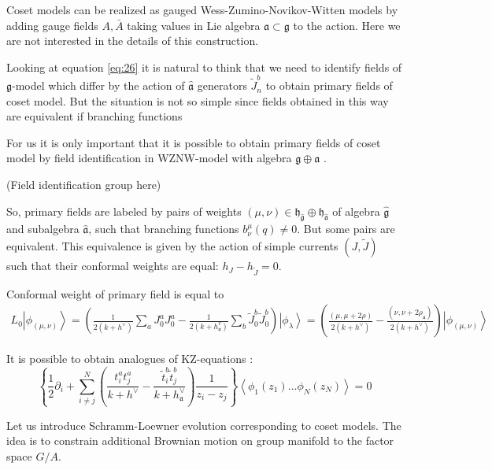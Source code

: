 \documentclass[a4paper]{jpconf}
\theoremstyle{definition}
\newcommand{\gf}{\mathfrak{g}}
\newcommand{\af}{\mathfrak{a}}
\newcommand{\hf}{\mathfrak{h}}
\newcommand{\gfh}{\hat{\mathfrak{g}}}
\newcommand{\afh}{\hat{\mathfrak{a}}}
\theoremstyle{definition} \newtheorem{Def}{Definition}
\begin{document}
Coset models can be realized as gauged Wess-Zumino-Novikov-Witten models by adding gauge fields  $A, \bar{A}$ taking values in Lie algebra $\af\subset \gf$ to the action\cite{gawdzki1988g}. Here we are not interested in the details of this construction. 

Looking at equation \eqref{eq:26} it is natural to think that we need to identify fields of $\gf$-model which differ by the action of $\afh$ generators $\tilde{J}_{n}^{b}$ to obtain primary fields of coset model. But the situation is not so simple since fields obtained in this way are equivalent if branching functions 

For us it is only important that it is possible to obtain primary fields of coset model by field identification in WZNW-model with algebra $\gf\oplus \af$ \cite{fuchs1996resolution,schellekens1990field}.

(Field identification group here)
 
So, primary fields are labeled by pairs of weights $(\mu,\nu)\in \hf_{\gfh}\oplus \hf_{\afh}$  of algebra $\gfh$ and subalgebra $\afh$, such that branching functions $b^{\mu}_{\nu}(q)\neq 0$. But some pairs are equivalent. This equivalence is given by the action of simple currents $(J,\tilde{J})$ such that their conformal weights are equal:  $h_{J}-h_{\tilde{J}}=0$. 

Conformal weight of primary field is equal to
\begin{multline}
  L_0\left|\phi_{(\mu,\nu)}\right>=\left(\frac{1}{2(k+h^{\vee})}\sum_aJ^a_0J^a_0-\frac{1}{2(k+h_{\af}^v)}\sum_b \tilde{J}^b_0 \tilde{J}^b_0 \right)
  \left|\phi_{\lambda}\right>=
  \left(\frac{(\mu,\mu+2\rho)}{2(k+h^{\vee})}-\frac{(\nu,\nu+2\rho_{\af})}{2(k+h^{\vee})}\right)\left|\phi_{(\mu,\nu)}\right>
\end{multline}


It is possible to obtain analogues of KZ-equations \cite{kogan1997knizhnik}:
\begin{equation*}
  \left\{\frac{1}{2}\partial_{i} + \sum_{i\neq j}^{N}\left(\frac{t^{a}_{i}t^{a}_{j}}{k+h^{\vee}}-\frac{\tilde t^{b}_{i}\tilde t^{b}_{j}}{k+h^{\vee}_{\af}}\right)\frac{1}{z_{i}-z_{j}}\right\} \left<\phi_{1}(z_{1})\dots \phi_{N}(z_{N})\right>=0
\end{equation*}

Let us introduce Schramm-Loewner evolution corresponding to coset models. 
The idea is to constrain additional Brownian motion on group manifold to the factor space $G/A$. 
\end{document}
